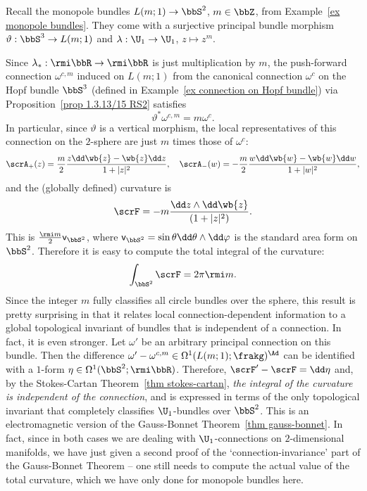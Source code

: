\begin{example}\label{ex connection on monopole bundles}
    Recall the monopole bundles $L(m;1)\to \bbS^2$, $m\in\bbZ$, from Example~\ref{ex monopole bundles}. They come with a surjective principal bundle morphism $\vartheta:\bbS^3\to L(m;1)$ and $\lambda:\U_1\to \U_1$, $z\mapsto z^m$. 
    
    Since $\lambda_\ast:\rmi \bbR\to\rmi\bbR$ is just multiplication by $m$, the push-forward connection $\omega^{c,m}$ induced on $L(m;1)$ from the canonical connection $\omega^c$ on the Hopf bundle $\bbS^3$ (defined in Example~\ref{ex connection on Hopf bundle}) via Proposition~\ref{prop 1.3.13/15 RS2} satisfies
    \[\vartheta^\ast \omega^{c,m}=m \omega^c.\]
    In particular, since $\vartheta$ is a vertical morphism, the local representatives of this connection on the $2$-sphere are just $m$ times those of $\omega^c$:
    \[\scrA_+(z)=\frac{m}{2}\frac{z \dd \wb{z}-\wb{z}\dd z}{1+|z|^2},\quad \scrA_-(w)=-\frac{m}{2}\frac{w \dd \wb{w}-\wb{w}\dd w}{1+|w|^2},\]
    and the (globally defined) curvature is
    \[\scrF=-m\frac{\dd z\wedge\dd \wb{z}}{(1+|z|^2)}.\]
    This is $\frac{\rmi m}{2}\mathsf{v}_{\bbS^2}$, where $\mathsf{v}_{\bbS^2}=\sin\theta\dd\theta\wedge\dd\varphi$ is the standard area form on $\bbS^2$. Therefore it is easy to compute the total integral of the curvature:
    \[\int_{\bbS^2} \scrF =2\pi \rmi m.\]
    Since the integer $m$ fully classifies all circle bundles over the sphere, this result is pretty surprising in that it relates local connection-dependent information to a global topological invariant of bundles that is independent of a connection. In fact, it is even stronger. Let $\omega'$ be an arbitrary principal connection on this bundle. Then the difference $\omega'-\omega^{c,m}\in\Omega^1(L(m;1);\frakg)^\Ad$ can be identified with a $1$-form $\eta\in\Omega^1(\bbS^2;\rmi \bbR)$. Therefore, $\scrF'-\scrF=\dd \eta$ and, by the Stokes-Cartan Theorem~\ref{thm stokes-cartan}, \emph{the integral of the curvature is independent of the connection}, and is expressed in terms of the only topological invariant that completely classifies $\U_1$-bundles over $\bbS^2$. This is an electromagnetic version of the Gauss-Bonnet Theorem~\ref{thm gauss-bonnet}. In fact, since in both cases we are dealing with $\U_1$-connections on $2$-dimensional manifolds, we have just given a second proof of the `connection-invariance' part of the Gauss-Bonnet Theorem -- one still needs to compute the actual value of the total curvature, which we have only done for monopole bundles here.
\end{example}


